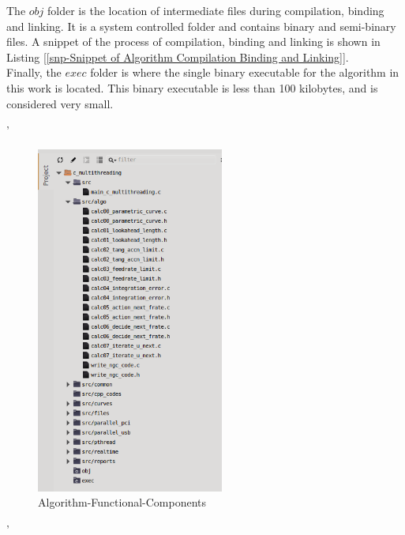 The $obj$ folder is the location of intermediate files during compilation, binding and linking. It is a system controlled folder and contains binary and semi-binary files. A snippet of the process of compilation, binding and linking is shown in Listing [\ref{snp-Snippet of Algorithm Compilation Binding and Linking}].\\

Finally, the $exec$ folder is where the single binary executable for the algorithm in this work is located. This binary executable is less than 100 kilobytes, and is considered very small.

\clearpage
\pagebreak'


\begin{figure}
	\caption  {Algorithm-Functional-Components}
	\label{img-Algorithm-Functional-Components}
	\includegraphics[width=0.55\textwidth]{Chap4/BW-Image-Algorithm-Functional-Components.png} 
\end{figure}

\clearpage
\pagebreak'



